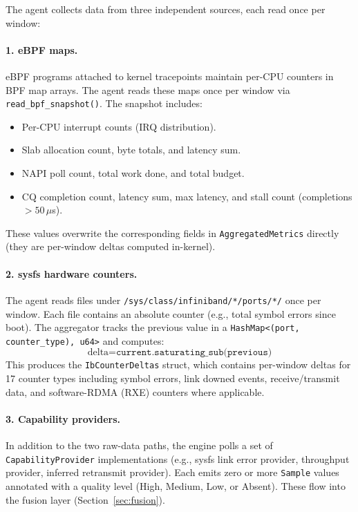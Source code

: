 \documentclass[11pt]{article}
\begin{document}
The agent collects data from three independent sources, each read once per
window:

\paragraph{1. eBPF maps.}
eBPF programs attached to kernel tracepoints maintain per-CPU counters in
BPF map arrays. The agent reads these maps once per window via
\texttt{read\_bpf\_snapshot()}. The snapshot includes:
\begin{itemize}[nosep]
  \item Per-CPU interrupt counts (IRQ distribution).
  \item Slab allocation count, byte totals, and latency sum.
  \item NAPI poll count, total work done, and total budget.
  \item CQ completion count, latency sum, max latency, and stall count
        (completions $> 50\,\mu$s).
\end{itemize}
These values overwrite the corresponding fields in
\texttt{AggregatedMetrics} directly (they are per-window deltas computed
in-kernel).

\paragraph{2. sysfs hardware counters.}
The agent reads files under \texttt{/sys/class/infiniband/*/ports/*/} once
per window. Each file contains an absolute counter (e.g., total symbol errors
since boot). The aggregator tracks the previous value in a
\texttt{HashMap<(port, counter\_type), u64>} and computes:
\[
  \text{delta} = \texttt{current.saturating\_sub(previous)}
\]
This produces the \texttt{IbCounterDeltas} struct, which contains per-window
deltas for 17 counter types including symbol errors, link downed events,
receive/transmit data, and software-RDMA (RXE) counters where applicable.

\paragraph{3. Capability providers.}
In addition to the two raw-data paths, the engine polls a set of
\texttt{CapabilityProvider} implementations (e.g., sysfs link error
provider, throughput provider, inferred retransmit provider). Each emits
zero or more \texttt{Sample} values annotated with a quality level
(High, Medium, Low, or Absent). These flow into the fusion layer
(Section~\ref{sec:fusion}).
\end{document}
